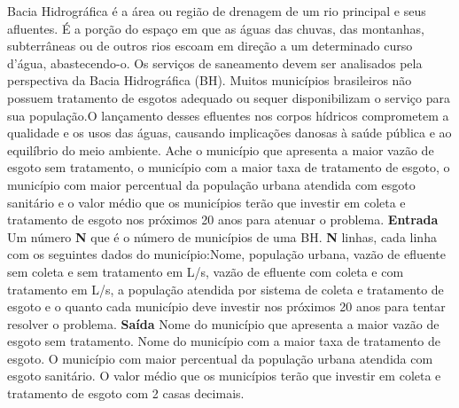 \documentclass[a4paper, 12pt]{article}
\begin{document}
\vspace{5pt} 
Bacia Hidrográfica é a área ou região de drenagem de um rio principal e seus afluentes. É a porção do espaço em que as águas das chuvas, das montanhas, subterrâneas ou de outros rios escoam em direção a um determinado curso d’água, abastecendo-o. Os serviços de saneamento devem ser analisados pela perspectiva da Bacia Hidrográfica (BH).  Muitos municípios brasileiros não possuem tratamento de esgotos adequado ou sequer disponibilizam o serviço para sua população.O lançamento desses efluentes nos corpos hídricos comprometem a qualidade e os usos das águas, causando implicações danosas à saúde pública e ao equilíbrio do meio ambiente.\newline
Ache o município que apresenta a maior vazão de esgoto sem tratamento, o município com a maior taxa de tratamento de esgoto, o município com maior percentual da população urbana atendida com esgoto sanitário e o valor médio que os municípios terão que investir em coleta e tratamento de esgoto nos próximos 20 anos para atenuar o problema.
\newline \newline
\textbf{{\large Entrada}} \newline
Um número \textbf{N} que é o número de municípios de uma BH. \newline
\textbf{N} linhas, cada linha com os seguintes dados do município:\newline Nome, população urbana, vazão de efluente sem coleta e sem tratamento em L/s, vazão de efluente com coleta e com tratamento em L/s, a população atendida por sistema de coleta e tratamento de esgoto e o quanto cada município deve investir nos próximos 20 anos para tentar resolver o problema.
\newline \newline
\textbf{{\large Saída}} \newline
Nome do município que apresenta a maior vazão de esgoto sem tratamento.\newline
Nome do município com a maior taxa de tratamento de esgoto. \newline
O município com maior percentual da população urbana atendida com esgoto sanitário. \newline
O valor médio que os municípios terão que investir em coleta e tratamento de esgoto com 2 casas decimais.
\newline \newline
\newline
\end{document}
